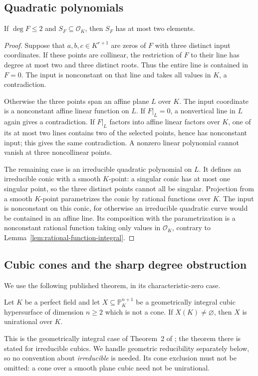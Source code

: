 \subsection{Quadratic polynomials}

\begin{lemma}\label{lem:quadratic-integral}
If $\deg F\le2$ and $S_F\subseteq\mathcal O_K$, then $S_F$ has at most two
elements.
\end{lemma}
\begin{proof}
Suppose that $a,b,c\in K^{r+1}$ are zeros of $F$ with three distinct input
coordinates.  If these points are collinear, the restriction of $F$ to their
line has degree at most two and three distinct roots.  Thus the entire
line is contained in $F=0$.  The input is nonconstant on that line and takes
all values in $K$, a contradiction.

Otherwise the three points span an affine plane $L$ over $K$.  The input
coordinate is a nonconstant affine linear function on $L$.  If
$F|_L=0$, a nonvertical line in $L$ again gives a contradiction.  If
$F|_L$ factors into affine linear factors over $K$, one of its at most two
lines contains two of the selected points, hence has nonconstant input;
this gives the same contradiction.  A nonzero linear polynomial cannot
vanish at three noncollinear points.

The remaining case is an irreducible quadratic polynomial on $L$.
It defines an irreducible conic with a smooth $K$-point: a singular conic
has at most one singular point, so the three distinct points cannot all be
singular.  Projection from a smooth $K$-point parametrizes the conic by
rational functions over $K$.  The input is nonconstant on this conic,
for otherwise an irreducible quadratic curve would be contained in an
affine line.  Its composition with the parametrization is a nonconstant
rational function taking only values in $\mathcal O_K$, contrary to
Lemma~\ref{lem:rational-function-integral}.
\end{proof}

\subsection{Cubic cones and the sharp degree obstruction}

We use the following published theorem, in its characteristic-zero case.
\begin{theorem}[Koll\'ar]\label{thm:kollar-input}
Let $K$ be a perfect field and let $X\subseteq\mathbb P^{n+1}_K$ be a
geometrically integral cubic hypersurface of dimension $n\ge2$ which is not a cone.
If $X(K)\neq\varnothing$, then $X$ is unirational over $K$.
\end{theorem}
This is the geometrically integral case of Theorem~2 of
\cite{lbKollar2002}; the theorem there is stated for irreducible cubics.
We handle geometric reducibility separately below, so no convention about
\emph{irreducible} is needed.  Its cone exclusion must not be omitted: a cone over a smooth plane cubic need not be unirational.

